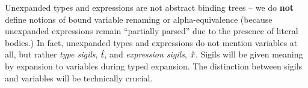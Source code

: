 Unexpanded types and expressions are not abstract binding trees -- we do \textbf{not} define notions of bound variable renaming or alpha-equivalence (because unexpanded expressions remain ``partially parsed'' due to the presence of literal bodies.) In fact, unexpanded types and expressions do not mention variables at all, but rather \emph{type sigils}, ${\hat{t}}$, and \emph{expression sigils}, ${\hat x}$. Sigils will be given meaning by expansion to variables during typed expansion. The distinction between sigils and variables will be technically crucial. %

